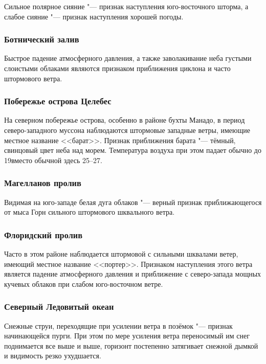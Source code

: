 Сильное полярное сияние "--- признак наступления юго-восточного шторма, а
слабое сияние "--- признак наступления хорошей погоды.

\subsubsection{Ботнический залив}

Быстрое падение атмосферного давления, а также заволакивание неба
густыми слоистыми облаками являются признаком приближения циклона и
часто штормового ветра.

\subsubsection{Побережье острова Целебес}

На северном побережье острова, особенно в районе бухты Манадо, в
период северо-западного муссона наблюдаются штормовые западные ветры,
имеющие местное название <<барат>>. Признак приближения барата "--- тёмный,
свинцовый цвет неба над морем. Температура воздуха при этом падает
обычно до 19\grC вместо обычной здесь 25--27\grC.

\subsubsection{Магелланов пролив}

Видимая на юго-западе белая дуга облаков "--- верный признак
приближающегося от мыса Горн сильного штормового шквального ветра.

\subsubsection{Флоридский пролив}

Часто в этом районе наблюдается штормовой с сильными шквалами ветер,
имеющий местное название <<портер>>. Признаком наступления этого ветра
является падение атмосферного давления и приближение с северо-запада
мощных кучевых облаков при слабом юго-восточном ветре.

\subsubsection{Северный Ледовитый океан}

Снежные струи, переходящие при усилении ветра в позёмок "--- признак
начинающейся пурги. При этом по мере усиления ветра переносимый им
снег поднимается все выше и выше, горизонт постепенно затягивает
снежной дымкой и видимость резко ухудшается.

